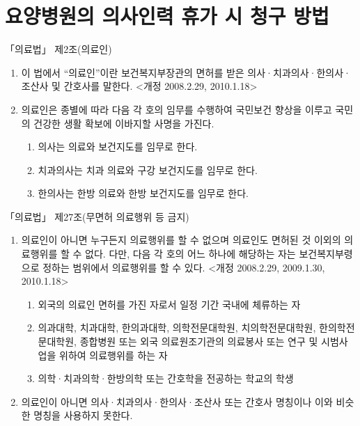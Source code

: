 ﻿\section{요양병원의 의사인력 휴가 시 청구 방법}

\begin{commentbox}{「의료법」 제2조(의료인)}
\begin{enumerate}[①]\tightlist
\item  이 법에서 “의료인”이란 보건복지부장관의 면허를 받은 의사·치과의사·한의사·조산사 및 간호사를 말한다. <개정 2008.2.29, 2010.1.18>
\item  의료인은 종별에 따라 다음 각 호의 임무를 수행하여 국민보건 향상을 이루고 국민의 건강한 생활 확보에 이바지할 사명을 가진다.
	\begin{enumerate}[1.]\tightlist
	\item  의사는 의료와 보건지도를 임무로 한다.
	\item  치과의사는 치과 의료와 구강 보건지도를 임무로 한다.
	\item  한의사는 한방 의료와 한방 보건지도를 임무로 한다.
	\end{enumerate}
\end{enumerate}	
\end{commentbox}


\begin{commentbox}{「의료법」 제27조(무면허 의료행위 등 금지)}
\begin{enumerate}[①]\tightlist
\item  의료인이 아니면 누구든지 의료행위를 할 수 없으며 의료인도 면허된 것 이외의 의료행위를 할 수 없다. 다만, 다음 각 호의 어느 하나에 해당하는 자는 보건복지부령으로 정하는 범위에서 의료행위를 할 수 있다. <개정 2008.2.29, 2009.1.30, 2010.1.18>
	\begin{enumerate}[1.]\tightlist
	\item  외국의 의료인 면허를 가진 자로서 일정 기간 국내에 체류하는 자
	\item  의과대학, 치과대학, 한의과대학, 의학전문대학원, 치의학전문대학원, 한의학전문대학원, 종합병원 또는 외국 의료원조기관의 의료봉사 또는 연구 및 시범사업을 위하여 의료행위를 하는 자
	\item  의학·치과의학·한방의학 또는 간호학을 전공하는 학교의 학생
	\end{enumerate}
\item  의료인이 아니면 의사·치과의사·한의사·조산사 또는 간호사 명칭이나 이와 비슷한 명칭을 사용하지 못한다.
\end{enumerate}
\end{commentbox}